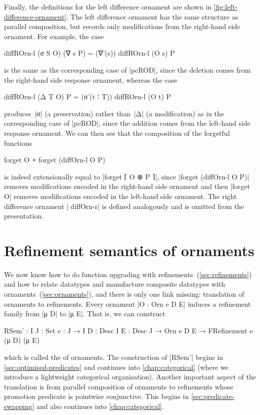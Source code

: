 Finally, the definitions for the left difference ornament are shown in \autoref{fig:left-difference-ornament}.
The left difference ornament has the same structure as parallel composition, but records only modifications from the right-hand side ornament.
For example, the case
\begin{code}
diffROrn-l (σ S O) (∇ s P) = (∇'(s)) diffROrn-l (O s) P
\end{code}
is the same as the corresponding case of |pcROD|, since the deletion comes from the right-hand side response ornament, whereas the case
\begin{code}
diffROrn-l (Δ T O) P = (σ'(t ∶ T)) diffROrn-l (O t) P
\end{code}
produces~|σ| (a preservation) rather than~|Δ| (a modification) as in the corresponding case of |pcROD|, since the addition comes from the left-hand side response ornament.
We can then see that the composition of the forgetful functions
\begin{code}
forget O ∘ forget (diffOrn-l  O P)
\end{code}
is indeed extensionally equal to |forget ⌈ O ⊗ P ⌉|, since |forget (diffOrn-l O P)| removes modifications encoded in the right-hand side ornament and then |forget O| removes modifications encoded in the left-hand side ornament.
The right difference ornament |^^^diffOrn-r| is defined analogously and is omitted from the presentation.

\section{Refinement semantics of ornaments}
\label{sec:refinement-semantics}

We now know how to do function upgrading with refinements~(\autoref{sec:refinements}) and how to relate datatypes and manufacture composite datatypes with ornaments~(\autoref{sec:ornaments}), and there is only one link missing: translation of ornaments to refinements.
Every ornament |O : Orn e D E| induces a refinement family from |μ D| to |μ E|.
That is, we can construct
\begin{code}
RSem' :  {I J : Set} {e : J → I} {D : Desc I} {E : Desc J} →
         Orn e D E → FRefinement e (μ D) (μ E)
\end{code}
which is called the  of ornaments.
The construction of |RSem'| begins in \autoref{sec:optimised-predicates} and continues into \autoref{chap:categorical} (where we introduce a lightweight categorical organisation).
Another important aspect of the translation is from parallel composition of ornaments to refinements whose promotion predicate is pointwise conjunctive.
This begins in \autoref{sec:predicate-swapping} and also continues into \autoref{chap:categorical}.


